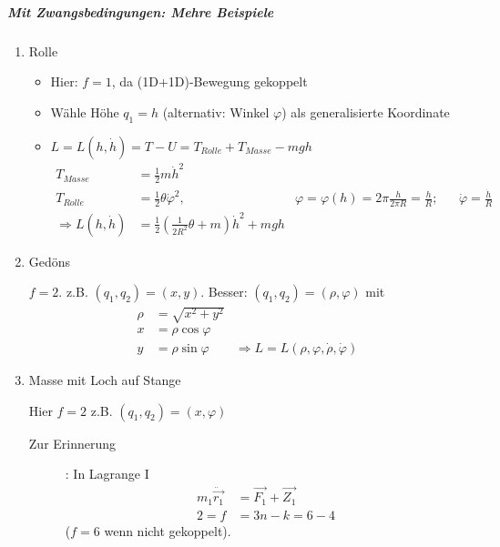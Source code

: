 \subparagraph{Mit Zwangsbedingungen: Mehre Beispiele}
\begin{enumerate}

\item\label{item:8} Rolle


\begin{itemize}
\item Hier: $f=1$, da (1D+1D)-Bewegung gekoppelt
\item Wähle Höhe $q_1=h$ (alternativ: Winkel $\varphi$) als
  generalisierte Koordinate
\item $L = L (h,\dot{h}) = T-U = T_{Rolle}+T_{Masse}-mgh$
\begin{align*}
  T_{Masse} &= \frac{1}{2}m\dot{h}^2\\
  T_{Rolle} &= \frac{1}{2}\theta\dot{\varphi}^2,
            &\varphi = \varphi(h) = 2\pi \frac{h}{2\pi R} = \frac{h}{R};
            &&\dot{\varphi}= \frac{\dot{h}}{R}\\
  \Rightarrow
  L(h,\dot{h}) &= \frac{1}{2}\left( \frac{1}{2R^2}\theta + m \right)\dot{h}^2 + mgh
\end{align*}

\end{itemize}

\item\label{item:7} Gedöns %


$f=2$. z.B. $(q_1, q_2) = (x,y)$. Besser: $(q_1,q_2) = (\rho,\varphi)$ mit
\begin{align*}
\rho &= \sqrt{x^2+y^2} \\
x &= \rho \cos \varphi \\
y &= \rho \sin \varphi
&\Rightarrow L = L \left( \rho, \varphi, \dot{\rho} ,\dot{\varphi} \right)
\end{align*}

\item\label{item:9} Masse mit Loch auf Stange

Hier $f=2$ z.B. $(q_1,q_2) = (x,\varphi)$

\begin{description}
\item[Zur Erinnerung]: In Lagrange I
\begin{align*}
  m_1 \ddot{\vec{r_1}} &= \vec{F_1} + \vec{Z_1} \\
  2 = f &= 3n - k = 6-4
\end{align*}
($f=6$ wenn nicht gekoppelt).


\end{description}
\end{enumerate}
